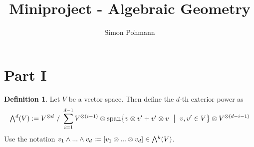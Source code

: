 \documentclass{scrartcl}
\title{Miniproject - Algebraic Geometry}
\author{Simon Pohmann}
\date{}
\newcommand{\extpow}{\mathchoice{{\textstyle\bigwedge}}
    {{\bigwedge}}
    {{\textstyle\wedge}}
    {{\scriptstyle\wedge}}}
\newcommand{\vspan}{\mathrm{span}}
\theoremstyle{definition}
\newtheorem{definition}[subsection]{Definition}
\begin{document}
\maketitle

\section{Part I}

\begin{definition}
    Let $V$ be a vector space.
    Then define the $d$-th exterior power as
    \begin{equation*}
        \extpow^d(V) := V^{\otimes d} \ / \ \sum_{i = 1}^{d - 1} V^{\otimes (i - 1)} \otimes \vspan\bigl\{ v \otimes v' + v' \otimes v \ \bigm| \ v, v' \in V \bigr\} \otimes V^{\otimes (d - i - 1)}
    \end{equation*}
    Use the notation $v_1 \wedge ... \wedge v_d := [v_1 \otimes ... \otimes v_d] \in \extpow^k(V)$.
\end{definition}
\end{document}
